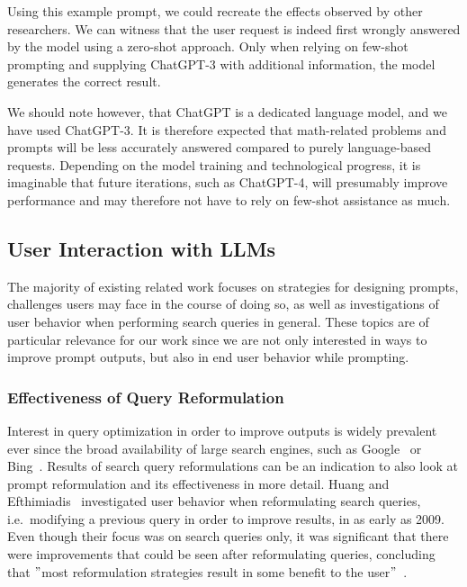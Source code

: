 
Using this example prompt, we could recreate the effects observed by other researchers.
We can witness that the user request is indeed first wrongly answered by the model
using a zero-shot approach.
Only when relying on few-shot prompting and supplying ChatGPT-3 with additional information,
the model generates the correct result.

We should note however, that ChatGPT is a dedicated language model, and we have used ChatGPT-3.
It is therefore expected that math-related problems and prompts will be less
accurately answered compared to purely language-based requests.
Depending on the model training and technological progress, it is imaginable that future
iterations, such as ChatGPT-4, will presumably improve performance and may therefore not have to
rely on few-shot assistance as much.


\subsection{User Interaction with LLMs}
\label{subsec:user-interaction-with-llms}
The majority of existing related work focuses on strategies for designing prompts,
challenges users may face in the course of doing so, as well as investigations of user behavior when
performing search queries in general.
These topics are of particular relevance for our work since we are not only interested in ways to
improve prompt outputs, but also in end user behavior while prompting.

\subsubsection{Effectiveness of Query Reformulation}
Interest in query optimization in order to improve outputs is widely prevalent ever since the broad
availability of large search engines, such as Google~\cite{google_google_2023} or Bing~\cite{microsoft_bing_2023}.
Results of search query reformulations can be an indication to also look at prompt reformulation
and its effectiveness in more detail.
Huang and Efthimiadis~\cite{huang_analyzing_2009} investigated user behavior when reformulating search
queries, i.e.\ modifying a previous query in order to improve results, in as early as 2009.
Even though their focus was on search queries only, it was significant that there were improvements
that could be seen after reformulating queries, concluding that
\("\)most reformulation strategies result in some benefit to the user\("\)~\cite[p. 1]{huang_analyzing_2009}.


